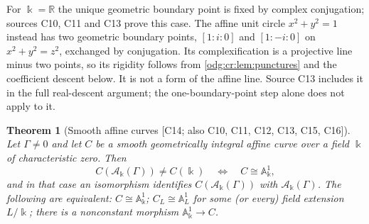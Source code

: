 \documentclass[11pt,oneside]{article}
\numberwithin{equation}{section}
\newtheorem{theorem}{Theorem}[section]
\theoremstyle{definition}
\theoremstyle{remark}
\newcommand{\R}{\mathbb R}
\newcommand{\src}[1]{\textup{\textsf{\small[#1]}}}
\newcommand{\crA}{\mathcal A_\Bbbk(\Gamma)}
\newcommand{\Aff}{\mathbb A}
\begin{document}
For $\Bbbk=\R$ the unique geometric boundary point is fixed by complex
conjugation; sources C10, C11 and C13 prove this case. The affine unit circle
$x^2+y^2=1$ instead has two geometric boundary points, $[1:i:0]$ and $[1:-i:0]$
on $x^2+y^2=z^2$, exchanged by conjugation. Its complexification is a projective
line minus two points, so its rigidity follows from
\cref{odg:cr:lem:punctures} and the coefficient descent below. It is not a form
of the affine line. Source C13 includes it in the full real-descent argument;
the one-boundary-point step alone does not apply to it.

\begin{theorem}[Smooth affine curves \src{C14; also C10, C11, C12, C13, C15, C16}]\label{odg:cr:thm:affine}
Let $\Gamma\ne0$ and let $C$ be a smooth geometrically integral affine curve over
a field $\Bbbk$ of characteristic zero. Then
\[
 C(\crA)\ne C(\Bbbk)\quad\Longleftrightarrow\quad C\cong\Aff^1_\Bbbk ,
\]
and in that case an isomorphism identifies $C(\crA)$ with $\crA$. The following
are equivalent: $C\cong\Aff^1_\Bbbk$; $C_{L}\cong\Aff^1_{L}$ for some (or every)
field extension $L/\Bbbk$; there is a nonconstant morphism $\Aff^1_\Bbbk\to C$.
\end{theorem}
\end{document}
